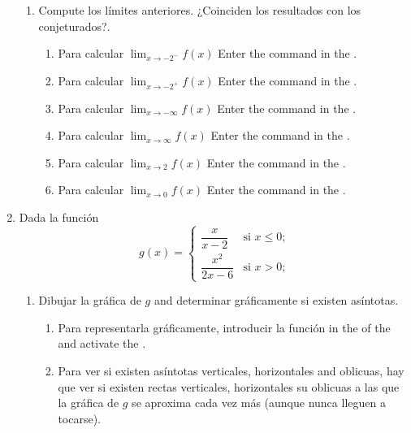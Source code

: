 \begin{enumerate}[leftmargin=*]
\begin{enumerate}
      \item Compute los límites anteriores. ¿Coinciden los resultados con los conjeturados?.
            \begin{indication}
            \begin{enumerate}
            \item Para calcular $\lim_{x\rightarrow -2^-} f(x)$ Enter the command  in the .
            \item Para calcular $\lim_{x\rightarrow -2^+} f(x)$ Enter the command  in the .
            \item Para calcular $\lim_{x\rightarrow -\infty} f(x)$ Enter the command  in the .
            \item Para calcular $\lim_{x\rightarrow \infty} f(x)$ Enter the command  in the .
            \item Para calcular $\lim_{x\rightarrow 2} f(x)$ Enter the command  in the .
            \item Para calcular $\lim_{x\rightarrow 0} f(x)$ Enter the command  in the .
            \end{enumerate}
            \end{indication}
      \end{enumerate}

\item Dada la función
      \[
      g(x)=
      \begin{cases}
      \dfrac{x}{x-2}    & \mbox{si $x\leq 0$;} \\
      \dfrac{x^2}{2x-6} & \mbox{si $x>0$;}
      \end{cases}
      \]
      \begin{enumerate}
      \item Dibujar la gráfica de $g$ and determinar gráficamente si existen asíntotas.
            \begin{indication}
            \begin{enumerate}
            \item Para representarla gráficamente, introducir la función  in the  of the   and activate the .
            \item Para ver si existen asíntotas verticales, horizontales and oblicuas, hay que ver si existen rectas verticales, horizontales su oblicuas a las que la gráfica de $g$ se aproxima cada vez más (aunque nunca lleguen a tocarse).
            \end{enumerate}
            \end{indication}


\end{enumerate}
\end{enumerate}
